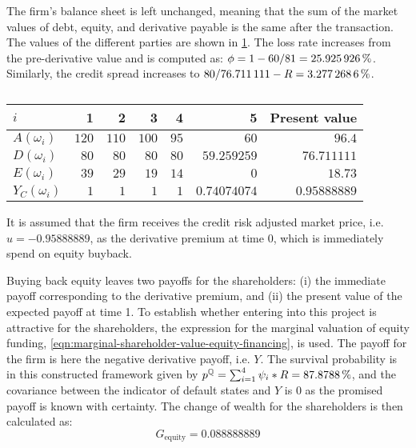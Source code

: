 \documentclass[main.tex]{subfiles}
\begin{document}
            The firm's balance sheet is left unchanged, meaning that the sum of the market values of debt, equity, 
            and derivative payable is the same after the transaction. 
            The values of the different parties are shown in \cref{tbl:example-equity-buyback}. 
            The loss rate increases from the pre-derivative value and is computed as:
            $\phi = 1 - \num{60}/\num{81} = \pct{0.25925926}$.
            Similarly, the credit spread increases to
            $\num{80}/\num{76.711111} - \grossrfrate = \pct{0.032772686}$.
            \begin{table}[H]
                \centering
                \begin{tabular}{l|rrrrr||r}
                    $i$ & 1 & 2 & 3 & 4 & 5 & Present value \\
                    \hline
                    $A(\omega_{i})$ & $\num{120}$ & $\num{110}$ & $\num{100}$ & $\num{95}$ & $\num{60}$ & $\num{96.4}$ \\
                    $D(\omega_{i})$ & $\num{80}$ & $\num{80}$ & $\num{80}$ & $\num{80}$ & $\num{59.259259}$ & $\num{76.711111}$ \\
                    $E(\omega_{i})$ & $\num{39}$ & $\num{29}$ & $\num{19}$ & $\num{14}$ & $\num{0}$ & $\num{18.73}$ \\
                    $Y_C(\omega_{i})$ & $\num{1}$ & $\num{1}$ & $\num{1}$ & $\num{1}$ & $\num{0.74074074}$ & $\num{0.95888889}$ \\
                \end{tabular}
                \caption{}
                \label{tbl:example-equity-buyback}
            \end{table}

            It is assumed that the firm receives the credit risk adjusted market price,
            i.e. $u=\num{-0.95888889}$, as the derivative premium at time 0, which is immediately spend on equity buyback.

            Buying back equity leaves two payoffs for the shareholders:
            (i) the immediate payoff corresponding to the derivative premium, and
            (ii) the present value of the expected payoff at time 1.
            To establish whether entering into this project is attractive for the shareholders,
            the expression for the marginal valuation of equity funding, \cref{eqn:marginal-shareholder-value-equity-financing}, is used.
            The payoff for the firm is here the negative derivative payoff, i.e. $Y$.
            The survival probability is in this constructed framework given by $p^{\rnmeasure} = \sum_{i=1}^{4} \psi_{i} * \grossrfrate = \pct{0.878788}$, and the covariance between the indicator of default states and $Y$ is 0 as the promised payoff is known with certainty.
            The change of wealth for the shareholders is then calculated as:
            \begin{equation}
                G_{\text{equity}} = \num{0.088888889}
            \end{equation}
            
\end{document}
